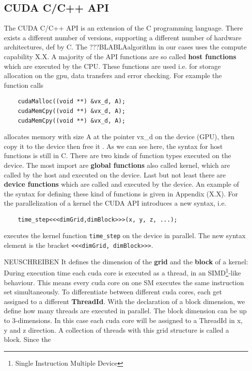 \subsection{CUDA C/C++ API}

The CUDA C/C++ API is an extension of the C programming language.
There exists a different number of versions, supporting a different number of hardware architectures, def by C.
The ???BLABLAalgorithm in our cases uses the compute capability X.X.
A majority of the API functions are so called \textbf{host functions}  which are executed by the CPU.
These functions are used i.e. for storage allocation on the gpu, data transfers and error checking.
For example the function calls
\begin{verbatim}
    cudaMalloc((void **) &vx_d, A);
    cudaMemCpy((void **) &vx_d, A);
    cudaMemCpy((void **) &vx_d, A);
\end{verbatim}
allocates memory with size A at the pointer vx\_d on the device (GPU), then copy it to the device then free it . As we can see here, the syntax for host functions is still in C.
There are two kinds of function types executed on the device.
The most import are \textbf{global functions} also called kernel, which are called by the host and executed on the device.
Last but not least there are \textbf{device functions} which are called and executed by the device.
An example of the syntax for defining these kind of functions is given in Appendix (X.X).
For the parallelization of a kernel the CUDA API introduces a new syntax, i.e.

\begin{verbatim}
    time_step<<<dimGrid,dimBlock>>>(x, y, z, ...);
\end{verbatim}

executes the kernel function \texttt{time\_step} on the device in parallel.
The new syntax element is the bracket \texttt{<<<dimGrid, dimBlock>>>}.

NEUSCHREIBEN
It defines the dimension of the \textbf{grid} and the \textbf{block} of a kernel:
During execution time each cuda core is executed as a thread, in an SIMD\footnote{Single Instruction Multiple Device}-like behaviour.
This means every cuda core on one SM executes the same instruction set simultaneously. To differentiate between different cuda cores,
each get assigned to a different \textbf{ThreadId}.
With the declaration of a block dimension, we define how many threads are executed in parallel.
The block dimension can be up to 3-dimensions. In this case each cuda core will be assigned to a ThreadId in x, y and z direction.
A collection of threads with this grid structure is called a block.
Since the

